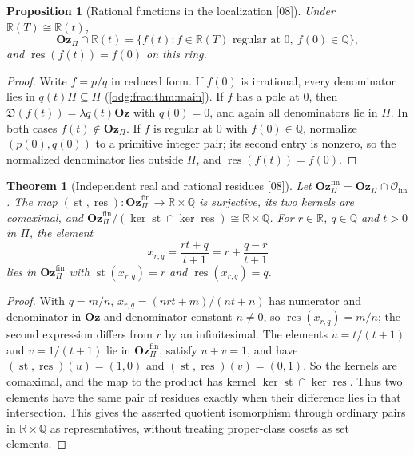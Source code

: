 \documentclass[11pt,oneside]{article}
\numberwithin{equation}{section}
\newtheorem{theorem}{Theorem}[section]
\newtheorem{proposition}[proposition]{Proposition}
\theoremstyle{definition}
\theoremstyle{remark}
\newcommand{\Oz}{\mathbf{Oz}}
\newcommand{\Q}{\mathbb Q}
\newcommand{\R}{\mathbb R}
\newcommand{\src}[1]{\textup{\textsf{\small[#1]}}}
\newcommand{\st}{\operatorname{st}}
\newcommand{\Ofin}{\mathcal O_{\mathrm{fin}}}
\newcommand{\Den}{\mathfrak D}
\newcommand{\res}{\operatorname{res}}
\begin{document}
\begin{proposition}[Rational functions in the localization \src{08}]\label{odg:frac:prop:localeval}
Under $\R(T)\cong\R(t)$,
\[
 \Oz_\Pi\cap\R(t)=\{f(t):f\in\R(T)\text{ regular at }0,\ f(0)\in\Q\},
\]
and $\res(f(t))=f(0)$ on this ring.
\end{proposition}
\begin{proof}
Write $f=p/q$ in reduced form. If $f(0)$ is irrational, every denominator lies in
$q(t)\Pi\subseteq\Pi$ (\cref{odg:frac:thm:main}). If $f$ has a pole at $0$, then
$\Den(f(t))=\lambda q(t)\Oz$ with $q(0)=0$, and again all denominators lie in
$\Pi$. In both cases $f(t)\notin\Oz_\Pi$. If $f$ is regular at $0$ with
$f(0)\in\Q$, normalize $(p(0),q(0))$ to a primitive integer pair; its second
entry is nonzero, so the normalized denominator lies outside $\Pi$, and
$\res(f(t))=f(0)$.
\end{proof}

\begin{theorem}[Independent real and rational residues \src{08}]\label{odg:frac:thm:tworesidues}
Let $\Oz_\Pi^{\mathrm{fin}}=\Oz_\Pi\cap\Ofin$. The map
$(\st,\res):\Oz_\Pi^{\mathrm{fin}}\to\R\times\Q$ is surjective, its two kernels
are comaximal, and
$\Oz_\Pi^{\mathrm{fin}}/(\ker\st\cap\ker\res)\cong\R\times\Q$. For $r\in\R$,
$q\in\Q$ and $t>0$ in $\Pi$, the element
\[
 x_{r,q}=\frac{rt+q}{t+1}=r+\frac{q-r}{t+1}
\]
lies in $\Oz_\Pi^{\mathrm{fin}}$ with $\st(x_{r,q})=r$ and $\res(x_{r,q})=q$.
\end{theorem}
\begin{proof}
With $q=m/n$, $x_{r,q}=(nrt+m)/(nt+n)$ has numerator and denominator in $\Oz$
and denominator constant $n\ne0$, so $\res(x_{r,q})=m/n$; the second expression
differs from $r$ by an infinitesimal. The elements $u=t/(t+1)$ and $v=1/(t+1)$
lie in $\Oz_\Pi^{\mathrm{fin}}$, satisfy $u+v=1$, and have
$(\st,\res)(u)=(1,0)$ and $(\st,\res)(v)=(0,1)$. So the kernels are comaximal, and
the map to the product has kernel $\ker\st\cap\ker\res$. Thus two
elements have the same pair of residues exactly when their difference lies
in that intersection. This gives the asserted quotient isomorphism through
ordinary pairs in $\R\times\Q$ as representatives, without treating
proper-class cosets as set elements.
\end{proof}
\end{document}
